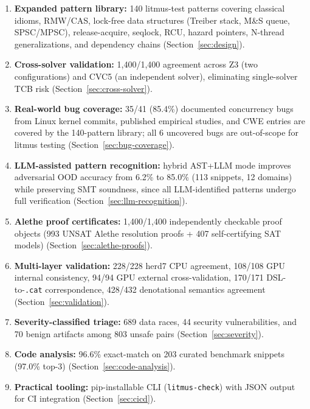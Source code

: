 \documentclass[11pt]{article}
\begin{document}
\begin{enumerate}[nosep]
\item \textbf{Expanded pattern library:} 140 litmus-test patterns covering
  classical idioms, RMW/CAS, lock-free data structures (Treiber stack,
  M\&S queue, SPSC/MPSC), release-acquire, seqlock, RCU, hazard pointers,
  N-thread generalizations, and dependency chains
  (Section~\ref{sec:design}).
\item \textbf{Cross-solver validation:} 1{,}400/1{,}400 agreement across
  Z3 (two configurations) and CVC5 (an independent solver),
  eliminating single-solver TCB risk
  (Section~\ref{sec:cross-solver}).
\item \textbf{Real-world bug coverage:} 35/41 (85.4\%) documented
  concurrency bugs from Linux kernel commits, published empirical
  studies, and CWE entries are covered by the 140-pattern library;
  all 6 uncovered bugs are out-of-scope for litmus testing
  (Section~\ref{sec:bug-coverage}).
\item \textbf{LLM-assisted pattern recognition:} hybrid AST+LLM mode
  improves adversarial OOD accuracy from 6.2\% to 85.0\%
  (113 snippets, 12 domains) while preserving
  SMT soundness, since all LLM-identified patterns undergo full
  verification (Section~\ref{sec:llm-recognition}).
\item \textbf{Alethe proof certificates:} 1{,}400/1{,}400 independently
  checkable proof objects (993 UNSAT Alethe resolution proofs +
  407 self-certifying SAT models)
  (Section~\ref{sec:alethe-proofs}).
\item \textbf{Multi-layer validation:} 228/228 herd7 CPU agreement,
  108/108 GPU internal consistency, 94/94 GPU external cross-validation,
  170/171 DSL-to-\texttt{.cat} correspondence, 428/432 denotational
  semantics agreement (Section~\ref{sec:validation}).
\item \textbf{Severity-classified triage:} 689 data races, 44
  security vulnerabilities, and 70 benign artifacts among 803
  unsafe pairs (Section~\ref{sec:severity}).
\item \textbf{Code analysis:} 96.6\% exact-match on 203 curated
  benchmark snippets (97.0\% top-3)
  (Section~\ref{sec:code-analysis}).
\item \textbf{Practical tooling:} pip-installable CLI
  (\texttt{litmus-check}) with JSON output for CI integration
  (Section~\ref{sec:cicd}).
\end{enumerate}

\end{document}
